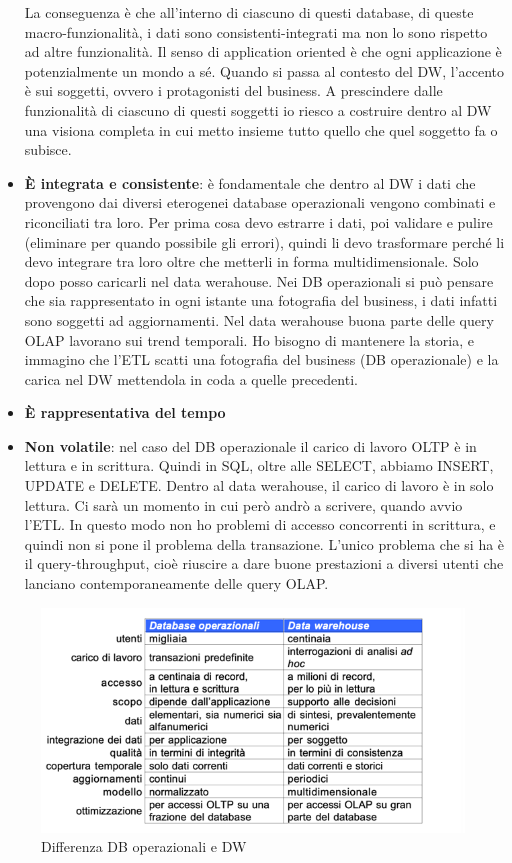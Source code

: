 \begin{itemize}
	La conseguenza è che all’interno di ciascuno di questi database, di queste macro-funzionalità, i dati sono consistenti-integrati ma non lo sono rispetto ad altre funzionalità. Il senso di application oriented è che ogni applicazione è potenzialmente un mondo a sé. Quando si passa al contesto del DW, l’accento è sui soggetti, ovvero i protagonisti del business. A prescindere dalle funzionalità di ciascuno di questi soggetti io riesco a costruire dentro al DW una visiona completa in cui metto insieme tutto quello che quel soggetto fa o subisce. 
	\item 
	\textbf{È integrata e consistente}: è fondamentale che dentro al DW i dati che provengono dai diversi eterogenei database operazionali vengono combinati e riconciliati tra loro. Per prima cosa devo estrarre i dati, poi validare e pulire (eliminare per quando possibile gli errori), quindi li devo trasformare perché li devo integrare tra loro oltre che metterli in forma multidimensionale. Solo dopo posso caricarli nel data werahouse.
	Nei DB operazionali si può pensare che sia rappresentato in ogni istante una fotografia del business, i dati infatti sono soggetti ad aggiornamenti. Nel data werahouse buona parte delle query OLAP lavorano sui trend temporali. Ho bisogno di mantenere la storia, e immagino che l’ETL scatti una fotografia del business (DB operazionale) e la carica nel DW mettendola in coda a quelle precedenti. 
	\item 
	\textbf{È rappresentativa del tempo}
	\item 
	\textbf{Non volatile}: nel caso del DB operazionale il carico di lavoro OLTP è in lettura e in scrittura. Quindi in SQL, oltre alle SELECT, abbiamo INSERT, UPDATE e DELETE. Dentro al data werahouse, il carico di lavoro è in solo lettura. Ci sarà un momento in cui però andrò a scrivere, quando avvio l’ETL. In questo modo non ho problemi di accesso concorrenti in scrittura, e quindi non si pone il problema della transazione. L’unico problema che si ha è il query-throughput, cioè riuscire a dare buone prestazioni a diversi utenti che lanciano contemporaneamente delle query OLAP.
\end{itemize}
\begin{figure}
	\centering
	\includegraphics[width=0.9\linewidth]{img/DBeDW}
	\caption{Differenza DB operazionali e DW}
	\label{fig:differenze}
\end{figure}
